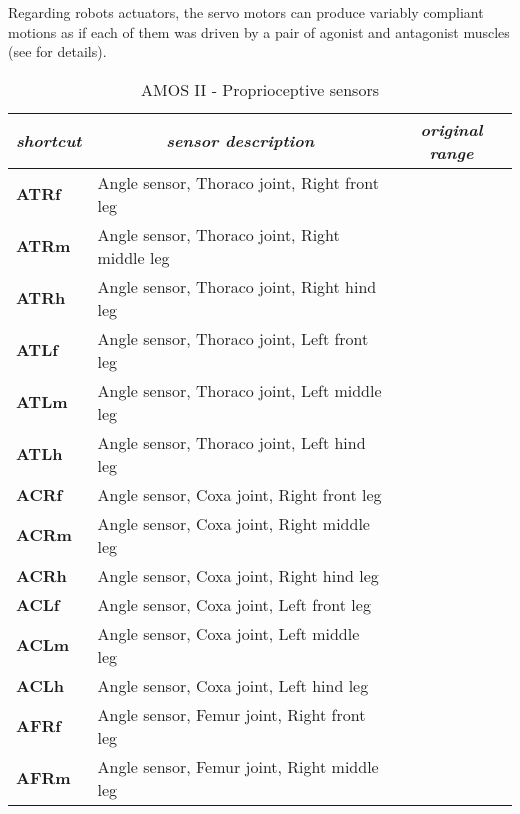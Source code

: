 Regarding robots actuators, the servo motors can produce variably compliant motions as if each of them was driven by a pair of agonist and antagonist muscles (see \cite{misc:amosii} for details). 

\begin{table}[H]
\centering
\caption{AMOS II - Proprioceptive sensors}
\label{tab:proprioceptors}
\begin{tabular}{|l|l|c|}
\hline
\textit{shortcut} & \multicolumn{1}{c|}{\textit{sensor description}} & \textit{original range} \\ \hline
\textbf{ATRf}         & Angle sensor, Thoraco joint, Right front leg     &                         \\ \hline
\textbf{ATRm}         & Angle sensor, Thoraco joint, Right middle leg    &                         \\ \hline
\textbf{ATRh}         & Angle sensor, Thoraco joint, Right hind leg      &                         \\ \hline
\textbf{ATLf}         & Angle sensor, Thoraco joint, Left front leg      &                         \\ \hline
\textbf{ATLm}         & Angle sensor, Thoraco joint, Left middle leg     &                         \\ \hline
\textbf{ATLh}         & Angle sensor, Thoraco joint, Left hind leg       &                         \\ \hline
\textbf{ACRf}         & Angle sensor, Coxa joint, Right front leg        &                         \\ \hline
\textbf{ACRm}         & Angle sensor, Coxa joint, Right middle leg       &                         \\ \hline
\textbf{ACRh}         & Angle sensor, Coxa joint, Right hind leg         &                         \\ \hline
\textbf{ACLf}         & Angle sensor, Coxa joint, Left front leg         &                         \\ \hline
\textbf{ACLm}         & Angle sensor, Coxa joint, Left middle leg        &                         \\ \hline
\textbf{ACLh}         & Angle sensor, Coxa joint, Left hind leg          &                         \\ \hline
\textbf{AFRf}         & Angle sensor, Femur joint, Right front leg       &                         \\ \hline
\textbf{AFRm}         & Angle sensor, Femur joint, Right middle leg      &                         \\ \hline

\end{tabular}
\end{table}
